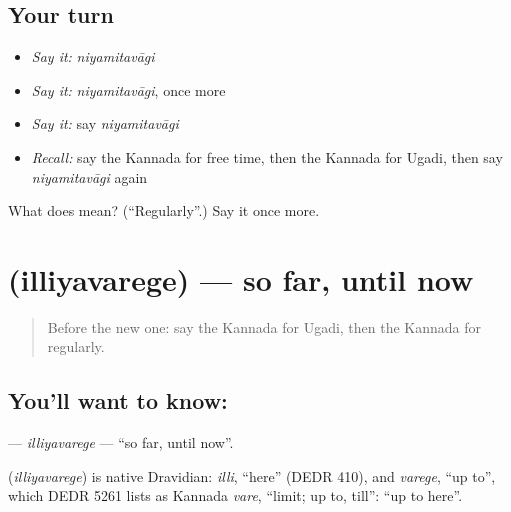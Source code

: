 \subsection*{Your turn}
\begin{itemize}
\raggedright
  \item \emph{Say it:} \emph{niyamitavāgi}
  \item \emph{Say it:} \emph{niyamitavāgi}, once more
  \item \emph{Say it:} say \emph{niyamitavāgi}
  \item \emph{Recall:} say the Kannada for free time, then the Kannada for Ugadi, then say \emph{niyamitavāgi} again
\end{itemize}

\begin{tcolorbox}[breakable,colback=teal!4,colframe=teal!35!black,title={Before you move on}]
What does  mean? (\textquotedblleft{}Regularly\textquotedblright{}.) Say it once more.
\end{tcolorbox}
\section[\texorpdfstring{\kn{ಇಲ್ಲಿಯವರೆಗೆ} (illiyavarege)}{ಇಲ್ಲಿಯವರೆಗೆ (illiyavarege)}]{ (illiyavarege) — so far, until now}

\label{lesson:KA-C211-illiyavarege}



\begin{quote}
Before the new one: say the Kannada for Ugadi, then the Kannada for regularly.
\end{quote}

\subsection*{You'll want to know: }
\textbf{} — \emph{illiyavarege} — \textquotedblleft{}so far, until now\textquotedblright{}.

\begin{cousinweb}
\textbf{} (\emph{illiyavarege}) is native Dravidian: \emph{illi}, \textquotedblleft{}here\textquotedblright{} (DEDR 410), and \emph{varege}, \textquotedblleft{}up to\textquotedblright{}, which DEDR 5261 lists as Kannada \emph{vare}, \textquotedblleft{}limit; up to, till\textquotedblright{}: \textquotedblleft{}up to here\textquotedblright{}.
\end{cousinweb}

